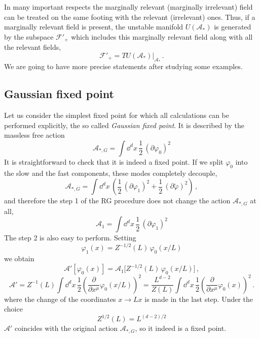 In many important respects the marginally relevant (marginally irrelevant) field
can be treated on the same footing with the relevant (irrelevant) ones. Thus, if a
marginally relevant field is present, the unstable manifold $U(\mathcal A_*)$ is
generated by the subspace $\mathcal F'_+$ which includes this marginally relevant
field along with all the relevant fields,
\[
\mathcal F'_+=TU(\mathcal A_*)|_{\mathcal A_*}\,.
\]
We are going to have more precise statements after studying some examples.

\subsection*{Gaussian fixed point}

Let us consider the simplest fixed point for which all calculations can be
performed explicitly, the so called \emph{Gaussian fixed point}. It is described
by the massless free action
\[
\mathcal A_{*,G}=\int \dd^dx\,\frac12\,(\partial\varphi_0)^2
\]
It is straightforward to check that it is indeed a fixed point. If we split
$\varphi_0$ into the slow and the fast components, these modes completely
decouple,
\[
\mathcal A_{*,G}=\int \dd^dx\,\left(\frac12\,(\partial\varphi_1)^2+\frac12\,(\partial\tilde\varphi)^2\right)\,,
\]
and therefore the step 1 of the RG procedure does not change the action
$\mathcal A_{*,G}$ at all,
\[
\mathcal A_1=\int \dd^dx\,\frac12\,(\partial\varphi_1)^2
\]
The step 2 is also easy to perform. Setting
\[
\varphi_1(x)=Z^{-1/2}(L)\,\varphi_0(x/L)
\]
we obtain
\[
\mathcal A'[\varphi_0(x)]=\mathcal A_1\bigl[Z^{-1/2}(L)\,\varphi_0(x/L)\bigr]\,,
\]
\[
\mathcal A'=Z^{-1}(L)\int \dd^dx\,\frac12\left(\frac\partial{\partial x^\mu}\varphi_0(x/L)\right)^2=\frac{L^{d-2}}{Z(L)}\int \dd^dx\,\frac12\left(\frac\partial{\partial x^\mu}\varphi_0(x)\right)^2\,.
\]
where the change of the coordinates $x\to Lx$ is made in the last step. Under the
choice
\[
Z^{1/2}(L)=L^{(d-2)/2}
\]
$\mathcal A'$ coincides with the original action $\mathcal A_{*,G}$, so it indeed
is a fixed point.

